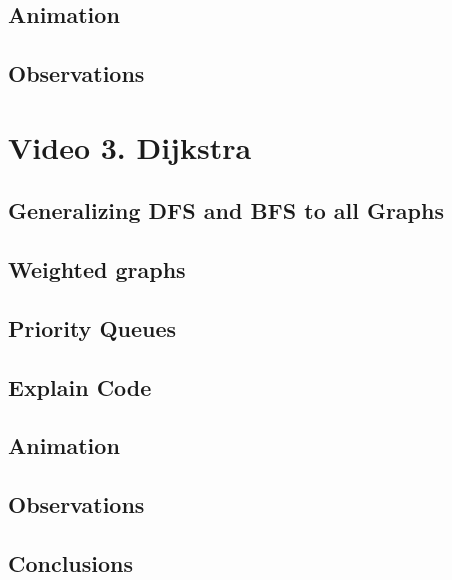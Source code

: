 \documentclass[12pt]{article}
\begin{document}
\subsection{Animation}

\subsection{Observations}

\section{Video 3. Dijkstra}

\subsection{Generalizing DFS and BFS to all Graphs}

\subsection{Weighted graphs}

\subsection{Priority Queues}

\subsection{Explain Code}

\subsection{Animation}

\subsection{Observations}

\subsection{Conclusions}
\end{document}
